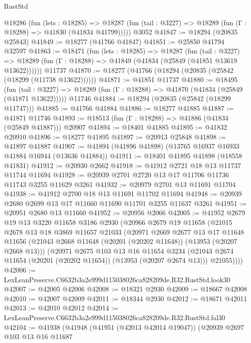 \begin{lexlean}{RustStd}
\begin{coremodule}
    @18286
      (fun (lets : @18285) =>
      @18287 (fun (tail : @3227) => @18289 (fun (Γ : @18288) => @41830 (@41834 @41799)))))
    @3052
@41847 := @18294 (@20835 @25843)
@41849 := @18277 (@41766 @41847)
@41851 := @25850 @41794 @32597
@41863 := @18471
    (fun (lets : @18285) =>
    @18287
      (fun (tail : @3227) =>
      @18289 (fun (Γ : @18288) => @41849 (@41834 (@25849 (@41851 @13619 @13622))))))
    @11737
@41870 := @18277 (@41766 (@18294 (@20835 (@25842 (@18299 (@11738 @13622))))))
@41871 := @41851 @11737
@41880 := @18495
    (fun (tail : @3227) => @18289 (fun (Γ : @18288) => @41870 (@41834 (@25849 (@41871 @13622)))))
    @11746
@41884 := @18294 (@20835 (@25842 (@18299 @11747)))
@41885 := @41766 @41884
@41886 := @18277 @41885
@41887 := @41871 @11746
@41893 := @18513 (fun (Γ : @18288) => @41886 (@41834 (@25849 @41887))) @20907
@41894 := @18401 @41885
@41895 := @41832 @20910
@41896 := @18277 @41895
@41897 := @20913 @25848
@41898 := @41897 @41887
@41907 := @41894 (@41896 @41898) (@13765 @16937 @16933 @41884 @16944 (@13636 @41884))
@41911 := @18401 @41895 @41898 (@18558 @41831)
@41912 := @20930 @2662
@41918 := @41912 @2721 @18 @13 @11737 @11744 @11694
@41928 := @20939 @2701 @2720 @13 @17 @11706 @11736 @11743 @3255 @11629 @3261
@41932 := @20979 @2701 @13 @11691 @11704
@41938 := @41912 @2700 @18 @13 @11691 @11702 @11694
@41948 := @20939 @2680 @2699 @13 @17 @11660 @11690 @11701 @3255 @11637 @3261
@41951 := @20951 @2680 @13 @11660
@41952 := @20956 @2066
@42005 := @41952
    @2679
    @19
    @13
    @3220
    @11658
    @3186
    @2930
    (@20966
      @2679
      @19
      @11658
      (@21015
        @2678
        @13
        @18
        @3869
        @11657
        @21033
        (@20971
          @2669
          @2677
          @13
          @17
          @11648
          @11656
          (@21043 @2668 @11648 (@20201 (@20202 @11648)) (@13953 (@20207 @2668 @13)))
          (@20971
            @2675
            @103
            @13
            @16
            @11654
            @3234
            (@21043 @2674 @11654 (@20201 (@20202 @11654)) (@13953 (@20207 @2674 @13)))
            @21055))))
@42006 := LexLeanPreserve.C6632b3a2e999d115038026ca828209de.R32.RustStd.look30
@42007 := @42005 @42006
@42008 := @18321 @2930
@42009 := @18667 @42008
@42010 := @42007 @42009
@42011 := @18344 @2930
@42012 := @18671 @42011
@42013 := @42010 @42012
@42014 := LexLeanPreserve.C6632b3a2e999d115038026ca828209de.R32.RustStd.fal30
@42104 := @41938
    (@41948
      (@41951 (@42013 @42014 @19047))
      (@20939
        @2697
        @103
        @13
        @16
        @11687

\end{coremodule}
\end{lexlean}
